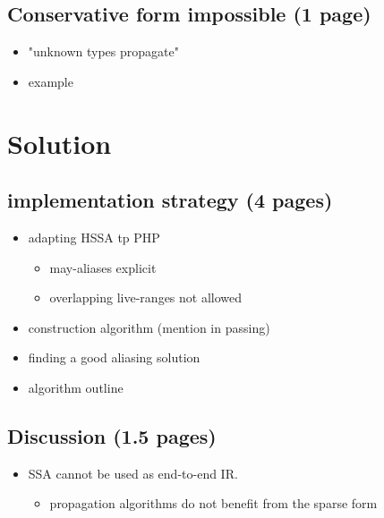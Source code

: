 \subsection{Conservative form impossible (1 page)}
\begin{itemize}
	\item "unknown types propagate"
	\item example
\end{itemize}

\section{Solution}

\subsection{implementation strategy (4 pages)}
\begin{itemize}
	\item adapting HSSA tp PHP
	\begin{itemize}
		\item may-aliases explicit
		\item overlapping live-ranges not allowed
	\end{itemize}
	\item construction algorithm (mention in passing)
   \item finding a good aliasing solution
	\item algorithm outline
\end{itemize}

\subsection{Discussion (1.5 pages)}
\begin{itemize}
   \item SSA cannot be used as end-to-end IR.
	\begin{itemize}
	\item propagation algorithms do not benefit from the sparse form
	\end{itemize}
\end{itemize}


